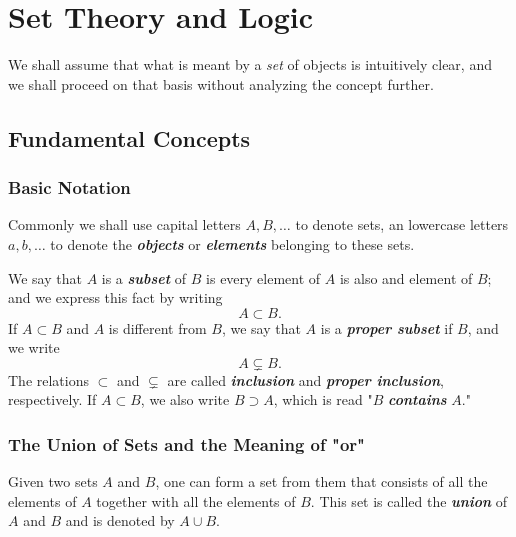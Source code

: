 \documentclass[a4paper,12pt,twoside,openany]{book}
\begin{document}

\restoregeometry
\thispagestyle{empty}
\setcounter{page}{0}
\tableofcontents
\thispagestyle{empty}
\setcounter{page}{0}


\chapter{Set Theory and Logic}

We shall assume that what is meant by a \textit{set} of objects is intuitively clear, and we shall proceed on that basis without analyzing the concept further.

\section{Fundamental Concepts}
\subsection{Basic Notation}

Commonly we shall use capital letters $A,B,\ldots$ to denote sets, an lowercase letters $a,b,\ldots$ to denote the \textit{\textbf{objects}} or \textit{\textbf{elements}} belonging to these sets.

We say that $A$ is a \textit{\textbf{subset}} of $B$ is every element of $A$ is also and element of $B$; and we express this fact by writing $$A\subset B.$$ If $A\subset B$ and $A$ is different from $B$, we say that $A$ is a \textit{\textbf{proper subset}} if $B$, and we write $$A\subsetneq B.$$ The relations $\subset$ and $\subsetneq$ are called \textit{\textbf{inclusion}} and \textit{\textbf{proper inclusion}}, respectively. If $A\subset B$, we also write $B\supset A$, which is read "$B$ \textit{\textbf{contains}} $A$."

\subsection{The Union of Sets and the Meaning of "or"}

Given two sets $A$ and $B$, one can form a set from them that consists of all the elements of $A$ together with all the elements of $B$. This set is called the \textit{\textbf{union}} of $A$ and $B$ and is denoted by $A\cup B$.
\end{document}
